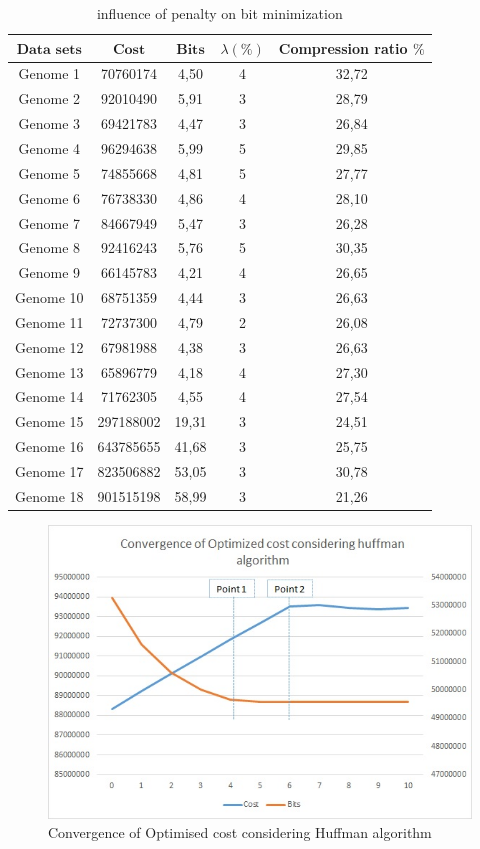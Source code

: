 \documentclass[preprint,12pt]{elsarticle}
\begin{document}
\begin{table}
\small
\label{datas}
\caption{influence of penalty on bit minimization}
\begin{center}
\begin{tabular}{c c c c c }
\toprule
$\textbf{Data sets}$ & $\textbf{Cost}$	& $\textbf{Bits}$ &		\textbf{$\lambda (\%)$} &		\textbf{Compression ratio $\%$} \\\hline
Genome 1 &	 70760174 &4,50& 4 & 32,72\\\hline
Genome 2 &	92010490& 5,91 & 3& 28,79\\\hline
Genome 3&	69421783& 4,47 &3& 26,84\\\hline
Genome 4&	96294638& 5,99 & 5& 29,85\\\hline
Genome 5&	74855668 &4,81& 5& 27,77\\\hline
Genome 6&	76738330& 4,86  &4& 28,10\\\hline
Genome 7&	84667949 &5,47& 3& 26,28\\\hline
Genome 8&	92416243 &5,76& 5& 30,35\\\hline
Genome 9&	66145783&4,21 & 4& 26,65\\\hline
Genome 10&	68751359& 4,44 &3& 26,63\\\hline
Genome 11&	72737300 &4,79& 2&26,08 \\\hline
Genome 12&	67981988 & 4,38&3& 26,63\\\hline
Genome 13&	65896779& 4,18 &4& 27,30\\\hline
Genome 14&	71762305 &4,55 &4&27,54 \\\hline
Genome 15&297188002 &19,31 & 3& 24,51\\\hline
Genome 16&643785655 & 41,68 & 3& 25,75 \\\hline
Genome 17&823506882 & 53,05 & 3& 30,78\\\hline
Genome 18&901515198 &58,99 & 3& 21,26\\\hline
\bottomrule
\end{tabular}
\end{center}
\end{table}
\begin{figure}[h]
\begin{center}
\includegraphics{Images/Drawing4.jpg}
\caption{Convergence of Optimised cost considering Huffman algorithm}
\end{center}
\label{Fig5}
\end{figure}
\end{document}
